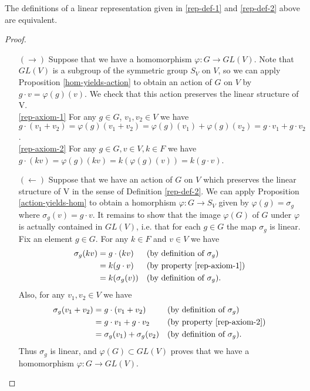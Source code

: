  
 \begin{prop}
The definitions of a linear representation given in \ref{rep-def-1} and \ref{rep-def-2} above are equivalent.
 \end{prop}
 \begin{proof}
 \begin{itemize}
\item[$(\rightarrow)$]  Suppose that we have a homomorphism $\varphi \colon G \to GL(V)$.  Note that $GL(V)$ is a subgroup of the symmetric group $S_V$ on $V$, so we can apply Proposition \ref{hom-yields-action} to obtain an action of $G$ on $V$ by $g \cdot v = \varphi(g)(v)$.  We check that this action preserves the linear structure of V.
\\\ref{rep-axiom-1} \quad For any $g \in G$, $v_1, v_2 \in V$ we have $g \cdot (v_1 +  v_2) = \varphi(g) (v_1 + v_2) = \varphi(g)(v_1) + \varphi(g)(v_2)= g \cdot v_1 + g \cdot v_2$.
\\\ref{rep-axiom-2} \quad For any $g \in G, v \in V, k \in F$ we have $g \cdot (kv) = \varphi(g)(kv) = k (\varphi(g)(v)) = k (g \cdot v)$.
\item[$(\leftarrow)$] Suppose that we have an action of $G$ on $V$ which preserves the linear structure of V in the sense of Definition \ref{rep-def-2}.  We can apply Proposition \ref{action-yields-hom} to obtain a homorphism $\varphi \colon G \to S_V$ given by $\varphi(g) = \sigma_g$ where $\sigma_g(v) = g \cdot v $.  It remains to show that the image $\varphi(G)$ of $G$ under $\varphi$ is actually contained in $GL(V)$, i.e. that for each $g \in G$ the map $\sigma_g$ is linear.  Fix an element $g \in G$. For any $k \in F$ and $v \in V$ we have
\begin{align*}
\sigma_g (kv) &= g \cdot (kv) && \text{(by definition of $\sigma_g$)} \\
		&= k (g \cdot v) && \text{(by property \ref{rep-axiom-1})} \\
		&= k (\sigma_g (v)) && \text{(by definition of $\sigma_g$)}.
\end{align*}
Also, for any $v_1, v_2 \in V$ we have
\begin{align*}
\sigma_g (v_1 + v_2) &= g \cdot (v_1 + v_2) && \text{(by definition of $\sigma_g$)} \\
		&= g \cdot v_1 + g \cdot v_2 && \text{(by property \ref{rep-axiom-2})} \\
		&= \sigma_g(v_1) + \sigma_g(v_2) && \text{(by definition of $\sigma_g$)}.
\end{align*}
Thus $\sigma_g$ is linear, and $\varphi(G) \subset GL(V)$ proves that we  have a homomorphism $\varphi \colon G \to GL(V)$.

\end{itemize}
 \end{proof}
